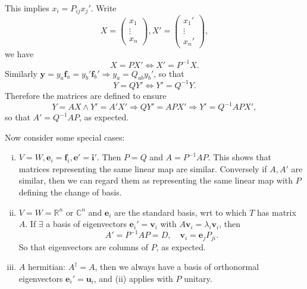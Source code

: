 \documentclass[a4paper]{article}
\begin{document}
    This implies $ x_i=P_{ij}x_j' $. Write
    \[
      X =
      \begin{pmatrix}
        x_1\\\vdots \\x_n
      \end{pmatrix}, X'=
      \begin{pmatrix}
        x_1'\\\vdots \\x_n'
      \end{pmatrix},
    \]
    we have
    \[
      X=PX' \Longleftrightarrow X'=P^{-1}X.
    \]
    Similarly $ \mathbf{y} = y_a\mathbf{f}_a = y_b'\mathbf{f}_b'
    \Rightarrow y_a=Q_{ab}y_b' $, so that
    \[
      Y=QY' \Longleftrightarrow Y'=Q^{-1}Y.
    \]
    Therefore the matrices are defined to ensure
    \[
      Y=AX \land Y'=A'X' \Longrightarrow QY'=APX' \Longrightarrow Y'=Q^{-1}APX',
    \]
    so that $ A'=Q^{-1}AP $, as expected.

    Now consider some special cases:
    \begin{enumerate}[(i)]
      \item $V=W, \mathbf{e}_i=\mathbf{f}_i,
        \mathbf{e}'=\mathbf{i}'$. Then $P=Q$ and $ A = P^{-1}AP $.
        This shows that matrices representing the same linear map are
        similar. Conversely if $A,A'$ are similar, then we can regard
        them as representing the same linear map with $P$ defining
        the change of basis.
      \item $V=W=\mathbb{R}^n$ or $\mathbb{C}^n$ and $ \mathbf{e}_i $
        are the standard basis, wrt to which $T$ has matrix $A$. If $
        \exists  $ a basis of eigenvectors $
        \mathbf{e}_i'=\mathbf{v}_i $ with $
        A\mathbf{v}_i=\lambda_i\mathbf{v}_i $, then
        \[
          A'= P^{-1}AP = D, \quad \mathbf{v}_i = \mathbf{e}_jP_{ji}.
        \]
        So that eigenvectors are columns of $P$, as expected.
      \item $A$ hermitian: $ A^\dagger =A $, then we always have a
        basis of orthonormal eigenvectors $
        \mathbf{e}_i'=\mathbf{u}_i $, and (ii) applies with $P$ unitary.
    \end{enumerate}
\end{document}
